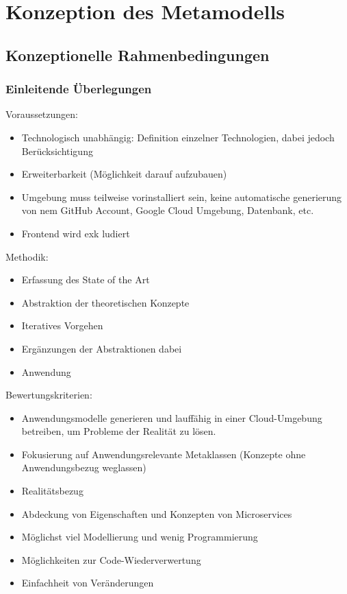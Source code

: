 \chapter{Konzeption des Metamodells}

\section{Konzeptionelle Rahmenbedingungen}

\subsection{Einleitende Überlegungen}

Voraussetzungen:
\begin{itemize}
    \item Technologisch unabhängig: Definition einzelner Technologien, dabei jedoch Berücksichtigung
    \item Erweiterbarkeit (Möglichkeit darauf aufzubauen)
    \item Umgebung muss teilweise vorinstalliert sein, keine automatische generierung von nem GitHub Account, Google Cloud Umgebung, Datenbank, etc.
    \item Frontend wird exk
   ludiert
\end{itemize}

Methodik:
\begin{itemize}
    \item Erfassung des State of the Art
    \item Abstraktion der theoretischen Konzepte
    \item Iteratives Vorgehen
    \item Ergänzungen der Abstraktionen dabei
    \item Anwendung
\end{itemize}

Bewertungskriterien:
\begin{itemize}
    \item Anwendungsmodelle generieren und lauffähig in einer Cloud-Umgebung betreiben, um Probleme der Realität zu lösen.
    \item Fokusierung auf Anwendungsrelevante Metaklassen (Konzepte ohne Anwendungsbezug weglassen)
    \item Realitätsbezug
    \item Abdeckung von Eigenschaften und Konzepten von Microservices
    \item Möglichst viel Modellierung und wenig Programmierung
    \item Möglichkeiten zur Code-Wiederverwertung
    \item Einfachheit von Veränderungen
\end{itemize}


